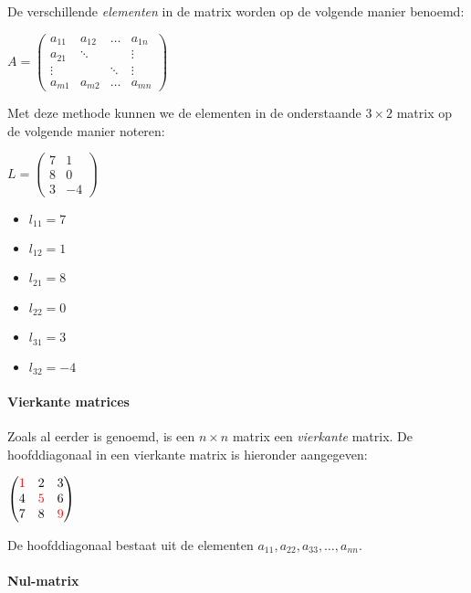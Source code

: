 \documentclass[11pt]{article}
\providecommand{\tightlist}{%
      \setlength{\itemsep}{0pt}\setlength{\parskip}{0pt}}
\begin{document}
De verschillende \emph{elementen} in de matrix worden op de volgende
manier benoemd:

    \(A = \begin{pmatrix} a_{11} & a_{12} & \ldots & a_{1n} \\ a_{21} & \ddots && \vdots \\ \vdots && \ddots & \vdots \\ a_{m1} & a_{m2} & \ldots & a_{mn} \end{pmatrix}\)

    Met deze methode kunnen we de elementen in de onderstaande
\(3 \times 2\) matrix op de volgende manier noteren:

\(L=\begin{pmatrix} 7 & 1 \\ 8 & 0 \\ 3 & -4 \end{pmatrix}\)

\begin{itemize}
\tightlist
\item
  \(l_{11} = 7\)
\item
  \(l_{12} = 1\)
\item
  \(l_{21} = 8\)
\item
  \(l_{22} = 0\)
\item
  \(l_{31} = 3\)
\item
  \(l_{32} = -4\)
\end{itemize}

    \hypertarget{vierkante-matrices}{%
\paragraph{Vierkante matrices}\label{vierkante-matrices}}

    Zoals al eerder is genoemd, is een \(n \times n\) matrix een
\emph{vierkante} matrix. De hoofddiagonaal in een vierkante matrix is
hieronder aangegeven:

\(\begin{pmatrix} \color{red}{1} & 2 & 3 \\ 4 & \color{red}{5} & 6 \\ 7 & 8 & \color{red}{9} \end{pmatrix}\)

De hoofddiagonaal bestaat uit de elementen
\(a_{11}, a_{22}, a_{33}, \ldots, a_{nn}\).

    \hypertarget{nul-matrix}{%
\paragraph{Nul-matrix}\label{nul-matrix}}
\end{document}
